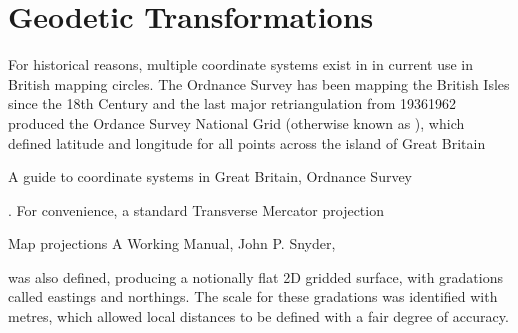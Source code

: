 \documentclass[letterpaper,10pt,english]{sphinxmanual}
\begin{document}
\chapter{Geodetic Transformations}
\label{\detokenize{index:geodetic-transformations}}
\sphinxAtStartPar
For historical reasons, multiple coordinate systems exist in in current use in
British mapping circles. The Ordnance Survey has been mapping the British Isles
since the 18th Century and the last major retriangulation from 1936\sphinxhyphen{}1962 produced
the Ordance Survey National Grid (otherwise known as ), which defined
latitude and longitude for all points across the island of Great Britain \sphinxstepexplicit %
\begin{footnote}[1]\label{\thesphinxscope.1}%
\sphinxAtStartFootnote
A guide to coordinate systems in Great Britain, Ordnance Survey
%
\end{footnote}.
For convenience, a standard Transverse Mercator projection \sphinxstepexplicit %
\begin{footnote}[2]\label{\thesphinxscope.2}%
\sphinxAtStartFootnote
Map projections \sphinxhyphen{} A Working Manual, John P. Snyder, 
%
\end{footnote} was also defined,
producing a notionally flat 2D gridded surface, with gradations called eastings
and northings. The scale for these gradations was identified with metres, which
allowed local distances to be defined with a fair degree of accuracy.
\end{document}
